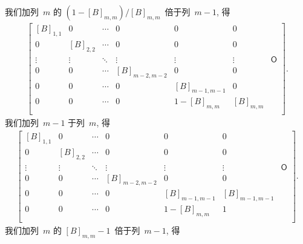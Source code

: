 \documentclass[../libro.tex]{subfiles}
\begin{document}
我们加列~\(m\) 的 \((1 - [B]_{m,m})/[B]_{m,m}\)~倍于列~\(m-1\), 得
\begin{align*}
    \begin{bmatrix}
        [B]_{1,1} & 0         & \cdots & 0             & 0             & 0         & {}         \\
        0         & [B]_{2,2} & \cdots & 0             & 0             & 0         & {}         \\
        \vdots    & \vdots    & \ddots & \vdots        & \vdots        & \vdots    & \mathsf{O} \\
        0         & 0         & \cdots & [B]_{m-2,m-2} & 0             & 0         & {}         \\
        0         & 0         & \cdots & 0             & [B]_{m-1,m-1} & 0         & {}         \\
        0         & 0         & \cdots & 0             & 1-[B]_{m,m}   & [B]_{m,m} & {}         \\
    \end{bmatrix}.
\end{align*}
我们加列~\(m-1\) 于列~\(m\), 得
\begin{align*}
    \begin{bmatrix}
        [B]_{1,1} & 0         & \cdots & 0             & 0             & 0             & {}         \\
        0         & [B]_{2,2} & \cdots & 0             & 0             & 0             & {}         \\
        \vdots    & \vdots    & \ddots & \vdots        & \vdots        & \vdots        & \mathsf{O} \\
        0         & 0         & \cdots & [B]_{m-2,m-2} & 0             & 0             & {}         \\
        0         & 0         & \cdots & 0             & [B]_{m-1,m-1} & [B]_{m-1,m-1} & {}         \\
        0         & 0         & \cdots & 0             & 1-[B]_{m,m}   & 1             & {}         \\
    \end{bmatrix}.
\end{align*}
我们加列~\(m\) 的 \([B]_{m,m}-1\)~倍于列~\(m-1\), 得
\end{document}
